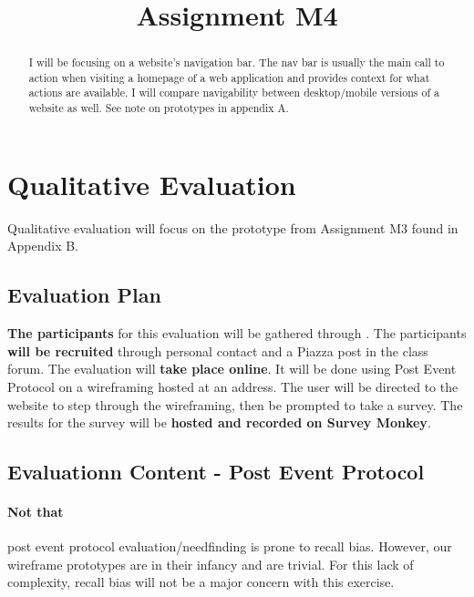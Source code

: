 

\title{Assignment M4\\}



\maketitle
\thispagestyle{fancy}

\begin{abstract}
I will be focusing on a website’s navigation bar. The nav bar is usually the main call to action when visiting a homepage of a web application and provides context for what actions are available. I will compare navigability between desktop/mobile versions of a website as well. See note on prototypes in appendix A.
\end{abstract}

\section{Qualitative Evaluation}
Qualitative evaluation will focus on the prototype from Assignment M3 found in Appendix B.

\subsection{Evaluation Plan}
\textbf{The participants} for this evaluation will be gathered through . The participants \textbf{will be recruited} through personal contact and a Piazza post in the class forum. The evaluation will \textbf{take place online}. It will be done using Post Event Protocol on a wireframing hosted at an address. The user will be directed to the website to step through the wireframing, then be prompted to take a survey. The results for the survey will be \textbf{hosted and recorded on Survey Monkey}.

\subsection{Evaluationn Content - Post Event Protocol}

\paragraph{Not that} post event protocol evaluation/needfinding is prone to recall bias. However, our wireframe prototypes are in their infancy and are trivial. For this lack of complexity, recall bias will not be a major concern with this exercise.

